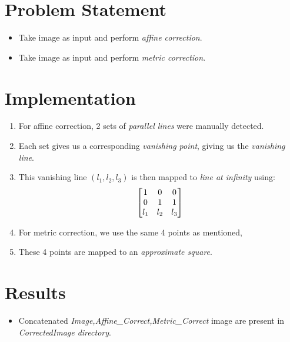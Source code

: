 \documentclass[12pt]{article}
\author{
  Gupta, Ankesh\\
  \texttt{2015CS10435}
}
\begin{document}
\maketitle

\section{Problem Statement}
\begin{itemize}
    \item Take image as input and perform \emph{affine correction}.
    \item Take image as input and perform \emph{metric correction}.
\end{itemize}


\section{Implementation}
\begin{enumerate}
    \item For affine correction, 2 sets of \emph{parallel lines} were manually detected.
    \item Each set gives us a corresponding \emph{vanishing point}, giving us the \emph{vanishing line}.
    \item This vanishing line $(l_1,l_2,l_3)$ is then mapped to \emph{line at infinity} using:
    \[
    \begin{bmatrix}
    \centering
    1 & 0 & 0 \\
    0 & 1 & 1 \\
    l_1 & l_2 & l_3
    \end{bmatrix}
    \]
    \item For metric correction, we use the same 4 points as mentioned, 
    \item These 4 points are mapped to an \emph{approximate square}.
\end{enumerate}

\section{Results}
\begin{itemize}
	\item Concatenated \emph{Image,Affine\_Correct,Metric\_Correct} image are present in \emph{CorrectedImage directory}.
\end{itemize}
\end{document}
